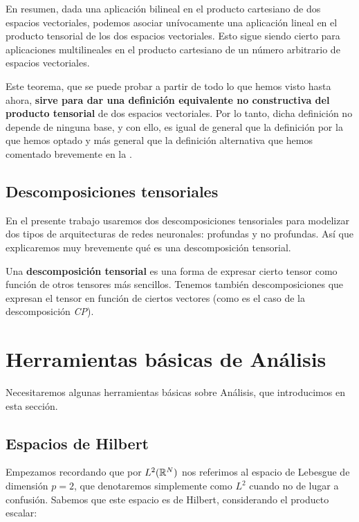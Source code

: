 En resumen, dada una aplicación bilineal en el producto cartesiano de dos espacios vectoriales, podemos asociar unívocamente una aplicación lineal en el producto tensorial de los dos espacios vectoriales. Esto sigue siendo cierto para aplicaciones multilineales en el producto cartesiano de un número arbitrario de espacios vectoriales.

Este teorema, que se puede probar a partir de todo lo que hemos visto hasta ahora, \textbf{sirve para dar una definición equivalente no constructiva del producto tensorial} de dos espacios vectoriales. Por lo tanto, dicha definición no depende de ninguna base, y con ello, es igual de general que la definición por la que hemos optado y más general que la definición alternativa que hemos comentado brevemente en la .

\subsection{Descomposiciones tensoriales}

En el presente trabajo usaremos dos descomposiciones tensoriales para modelizar dos tipos de arquitecturas de redes neuronales: profundas y no profundas. Así que explicaremos muy brevemente qué es una descomposición tensorial.

Una \textbf{descomposición tensorial} es una forma de expresar cierto tensor como función de otros tensores más sencillos. Tenemos también descomposiciones que expresan el tensor en función de ciertos vectores (como es el caso de la descomposición \textit{CP}).

\section{Herramientas básicas de Análisis} \label{sec:preliminares_funcional}

Necesitaremos algunas herramientas básicas sobre Análisis, que introducimos en esta sección.

\subsection{Espacios de Hilbert} \label{subsec:espacios_hilbert}

Empezamos recordando que por $L^2(\mathbb{R}^N)$ nos referimos al espacio de Lebesgue de dimensión $p = 2$, que denotaremos simplemente como $L^2$ cuando no de lugar a confusión. Sabemos que este espacio es de Hilbert, considerando el producto escalar:

